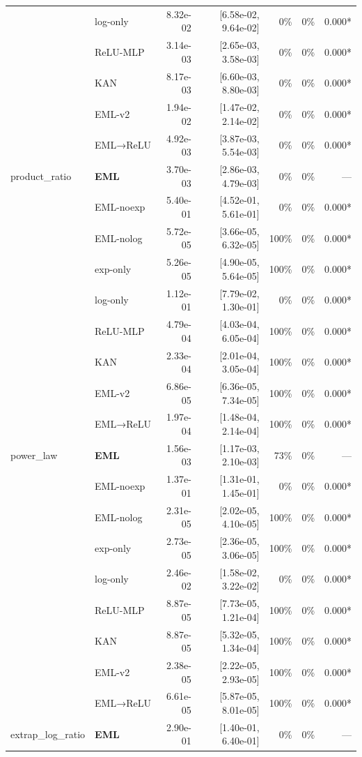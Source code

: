 \begin{table}[t]
\begin{tabular}{llrrrrr}
 & log-only & 8.32e-02 & [6.58e-02, 9.64e-02] & 0\% & 0\% & 0.000* \\
 & ReLU-MLP & 3.14e-03 & [2.65e-03, 3.58e-03] & 0\% & 0\% & 0.000* \\
 & KAN & 8.17e-03 & [6.60e-03, 8.80e-03] & 0\% & 0\% & 0.000* \\
 & EML-v2 & 1.94e-02 & [1.47e-02, 2.14e-02] & 0\% & 0\% & 0.000* \\
 & EML→ReLU & 4.92e-03 & [3.87e-03, 5.54e-03] & 0\% & 0\% & 0.000* \\
\midrule
product\_ratio & \textbf{EML} & 3.70e-03 & [2.86e-03, 4.79e-03] & 0\% & 0\% & — \\
 & EML-noexp & 5.40e-01 & [4.52e-01, 5.61e-01] & 0\% & 0\% & 0.000* \\
 & EML-nolog & 5.72e-05 & [3.66e-05, 6.32e-05] & 100\% & 0\% & 0.000* \\
 & exp-only & 5.26e-05 & [4.90e-05, 5.64e-05] & 100\% & 0\% & 0.000* \\
 & log-only & 1.12e-01 & [7.79e-02, 1.30e-01] & 0\% & 0\% & 0.000* \\
 & ReLU-MLP & 4.79e-04 & [4.03e-04, 6.05e-04] & 100\% & 0\% & 0.000* \\
 & KAN & 2.33e-04 & [2.01e-04, 3.05e-04] & 100\% & 0\% & 0.000* \\
 & EML-v2 & 6.86e-05 & [6.36e-05, 7.34e-05] & 100\% & 0\% & 0.000* \\
 & EML→ReLU & 1.97e-04 & [1.48e-04, 2.14e-04] & 100\% & 0\% & 0.000* \\
\midrule
power\_law & \textbf{EML} & 1.56e-03 & [1.17e-03, 2.10e-03] & 73\% & 0\% & — \\
 & EML-noexp & 1.37e-01 & [1.31e-01, 1.45e-01] & 0\% & 0\% & 0.000* \\
 & EML-nolog & 2.31e-05 & [2.02e-05, 4.10e-05] & 100\% & 0\% & 0.000* \\
 & exp-only & 2.73e-05 & [2.36e-05, 3.06e-05] & 100\% & 0\% & 0.000* \\
 & log-only & 2.46e-02 & [1.58e-02, 3.22e-02] & 0\% & 0\% & 0.000* \\
 & ReLU-MLP & 8.87e-05 & [7.73e-05, 1.21e-04] & 100\% & 0\% & 0.000* \\
 & KAN & 8.87e-05 & [5.32e-05, 1.34e-04] & 100\% & 0\% & 0.000* \\
 & EML-v2 & 2.38e-05 & [2.22e-05, 2.93e-05] & 100\% & 0\% & 0.000* \\
 & EML→ReLU & 6.61e-05 & [5.87e-05, 8.01e-05] & 100\% & 0\% & 0.000* \\
\midrule
extrap\_log\_ratio & \textbf{EML} & 2.90e-01 & [1.40e-01, 6.40e-01] & 0\% & 0\% & — \\

\end{tabular}
\end{table}
